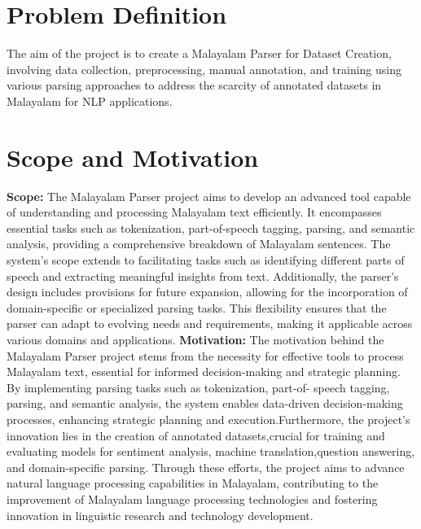 \documentclass[12pt,a4paper,titlepage]{report}
\begin{document}
	
	
	
	
	\section{Problem Definition}
	
	The aim of the project is to create a Malayalam Parser for Dataset Creation, involving data collection, preprocessing, manual annotation, and training using various parsing approaches to address the scarcity of annotated datasets in Malayalam for NLP applications.
	
	
	\section{Scope and Motivation}
	
	\textbf{Scope:}
	\newline
	The Malayalam Parser project aims to develop an advanced tool capable of
	understanding and processing Malayalam text efficiently. It encompasses essential
	tasks such as tokenization, part-of-speech tagging, parsing, and semantic analysis,
	providing a comprehensive breakdown of Malayalam sentences. The system's scope
	extends to facilitating tasks such as identifying different parts of speech and
	extracting meaningful insights from text. Additionally, the parser's design includes
	provisions for future expansion, allowing for the incorporation of domain-specific or specialized parsing tasks. This flexibility ensures that the parser can adapt to
	evolving needs and requirements, making it applicable across various domains and
	applications.
	\newline
	\textbf{Motivation:}
	\newline
	The motivation behind the Malayalam Parser project stems from the necessity for effective tools to process Malayalam text, essential for informed decision-making and strategic planning. By implementing parsing tasks such as tokenization, part-of-
	speech tagging, parsing, and semantic analysis, the system enables data-driven decision-making processes, enhancing strategic planning and execution.Furthermore, the project's innovation lies in the creation of annotated datasets,crucial for training and evaluating models for sentiment analysis, machine translation,question answering, and domain-specific parsing. Through these efforts, the project aims to advance natural language processing capabilities in Malayalam, contributing to the improvement of Malayalam language processing technologies and fostering innovation in linguistic research and technology development.
	
\end{document}
